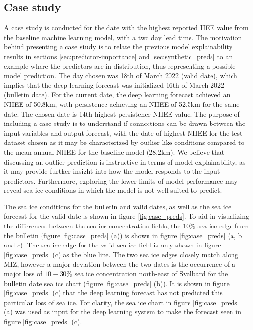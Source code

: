 \documentclass[../main/thesis.tex]{subfiles}
\begin{document}
\subsection{Case study}
A case study is conducted for the date with the highest reported IIEE value from the baseline machine learning model, with a two day lead time. The motivation behind presenting a case study is to relate the previous model explainability results in sections \ref{sec:predictor-importance} and \ref{sec:synthetic_preds} to an example where the predictors are in-distribution, thus representing a possible model prediction. The day chosen was 18th of March 2022 (valid date), which implies that the deep learning forecast was initialized 16th of March 2022 (bulletin date). For the current date, the deep learning forecast achieved an NIIEE of 50.8km, with persistence achieving an NIIEE of 52.5km for the same date. The chosen date is 14th highest persistence NIIEE value. The purpose of including a case study is to understand if connections can be drawn between the input variables and output forecast, with the date of highest NIIEE for the test dataset chosen as it may be characterized by outlier like conditions compared to the mean annual NIIEE for the baseline model (28.2km). We believe that discussing an outlier prediction is instructive in terms of model explainability, as it may provide further insight into how the model responds to the input predictors. Furthermore, exploring the lower limits of model performance may reveal sea ice conditions in which the model is not well suited to predict.

The sea ice conditions for the bulletin and valid dates, as well as the sea ice forecast for the valid date is shown in figure \ref{fig:case_preds}. To aid in visualizing the differences between the sea ice concentration fields, the 10\% sea ice edge from the bulletin (figure \ref{fig:case_preds} (a)) is shown in figure \ref{fig:case_preds} (a, b and c). The sea ice edge for the valid sea ice field is only shown in figure \ref{fig:case_preds} (c) as the blue line. The two sea ice edges closely match along MIZ, however a major deviation between the two dates is the occurrence of a major loss of $10-30\%$ sea ice concentration north-east of Svalbard for the bulletin date sea ice chart (figure \ref{fig:case_preds} (b)). It is shown in figure \ref{fig:case_preds} (c) that the deep learning forecast has not predicted this particular loss of sea ice. For clarity, the sea ice chart in figure \ref{fig:case_preds} (a) was used as input for the deep learning system to make the forecast seen in figure \ref{fig:case_preds} (c).
\end{document}
